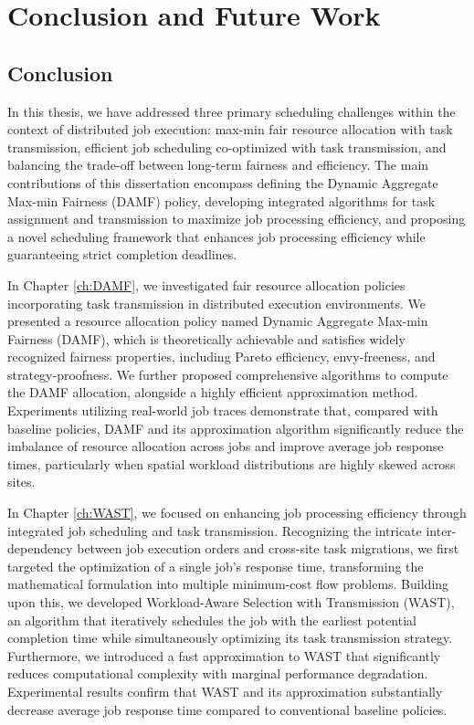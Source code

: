 \chapter{Conclusion and Future Work} %
\label{ch:Con}
\section{Conclusion}

In this thesis, we have addressed three primary scheduling challenges within the context of distributed job execution: max-min fair resource allocation with task transmission, efficient job scheduling co-optimized with task transmission, and balancing the trade-off between long-term fairness and efficiency. The main contributions of this dissertation encompass defining the Dynamic Aggregate Max-min Fairness (DAMF) policy, developing integrated algorithms for task assignment and transmission to maximize job processing efficiency, and proposing a novel scheduling framework that enhances job processing efficiency while guaranteeing strict completion deadlines. 

In Chapter \ref{ch:DAMF}, we investigated fair resource allocation policies incorporating task transmission in distributed execution environments. We presented a resource allocation policy named Dynamic Aggregate Max-min Fairness (DAMF), which is theoretically achievable and satisfies widely recognized fairness properties, including Pareto efficiency, envy-freeness, and strategy-proofness. We further proposed comprehensive algorithms to compute the DAMF allocation, alongside a highly efficient approximation method. Experiments utilizing real-world job traces demonstrate that, compared with baseline policies, DAMF and its approximation algorithm significantly reduce the imbalance of resource allocation across jobs and improve average job response times, particularly when spatial workload distributions are highly skewed across sites.

In Chapter \ref{ch:WAST}, we focused on enhancing job processing efficiency through integrated job scheduling and task transmission. Recognizing the intricate inter-dependency between job execution orders and cross-site task migrations, we first targeted the optimization of a single job's response time, transforming the mathematical formulation into multiple minimum-cost flow problems. Building upon this, we developed Workload-Aware Selection with Transmission (WAST), an algorithm that iteratively schedules the job with the earliest potential completion time while simultaneously optimizing its task transmission strategy. Furthermore, we introduced a fast approximation to WAST that significantly reduces computational complexity with marginal performance degradation. Experimental results confirm that WAST and its approximation substantially decrease average job response time compared to conventional baseline policies.

